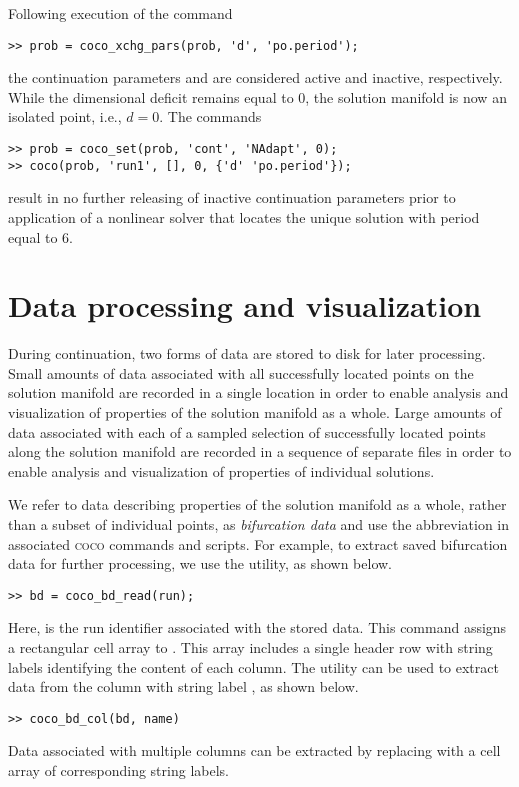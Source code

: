 Following execution of the command
\begin{lstlisting}[language=coco-highlight]
>> prob = coco_xchg_pars(prob, 'd', 'po.period');
\end{lstlisting}
the continuation parameters  and  are considered active and inactive, respectively. While the dimensional deficit remains equal to $0$, the solution manifold is now an isolated point, i.e., $d=0$. The commands
\begin{lstlisting}[language=coco-highlight]
>> prob = coco_set(prob, 'cont', 'NAdapt', 0);
>> coco(prob, 'run1', [], 0, {'d' 'po.period'});
\end{lstlisting}
result in no further releasing of inactive continuation parameters prior to application of a nonlinear solver that locates the unique solution with period equal to $6$.

\section{Data processing and visualization}

During continuation, two forms of data are stored to disk for later processing. Small amounts of data associated with all successfully located points on the solution manifold are recorded in a single location in order to enable analysis and visualization of properties of the solution manifold as a whole. Large amounts of data associated with each of a sampled selection of successfully located points along the solution manifold are recorded in a sequence of separate files in order to enable analysis and visualization of properties of individual solutions.

We refer to data describing properties of the solution manifold as a whole, rather than a subset of individual points, as \textit{bifurcation data} and use the abbreviation  in associated \textsc{coco} commands and scripts. For example, to extract saved bifurcation data for further processing, we use the  utility, as shown below.
 \begin{lstlisting}[language=coco-highlight]
>> bd = coco_bd_read(run);
\end{lstlisting}
Here,  is the run identifier associated with the stored data. This command assigns a rectangular cell array to . This array includes a single header row with string labels identifying the content of each column. The  utility can be used to extract data from the column with string label , as shown below.
 \begin{lstlisting}[language=coco-highlight]
>> coco_bd_col(bd, name)
\end{lstlisting}
Data associated with multiple columns can be extracted by replacing  with a cell array of corresponding string labels.

